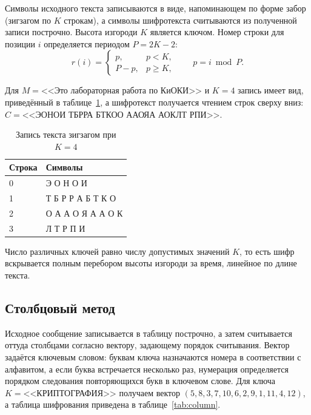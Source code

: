 \documentclass[14pt,a4paper]{extarticle}
\begin{document}
Символы исходного текста записываются в виде, напоминающем по форме забор
(зигзагом по $K$ строкам), а символы шифротекста считываются из полученной записи
построчно. Высота изгороди $K$ является ключом. Номер строки для позиции $i$
определяется периодом $P = 2K - 2$:
\begin{equation}
r(i) =
\begin{cases}
p, & p < K,\\
P - p, & p \geqslant K,
\end{cases}
\qquad p = i \bmod P.
\end{equation}

Для $M = \text{<<Это лабораторная работа по КиОКИ>>}$ и $K = 4$ запись имеет вид,
приведённый в таблице~\ref{tab:fence}, а шифротекст получается чтением строк сверху вниз:
$C = \text{<<ЭОНОИ ТБРРА БТКОО ААОЯА АОКЛТ РПИ>>}$.

\begin{table}[H]
\caption{Запись текста зигзагом при $K = 4$}
\label{tab:fence}
\centering
\begin{tabular}{ll}
\toprule
Строка & Символы \\
\midrule
0 & Э \quad О \quad Н \quad О \quad И \\
1 & Т \; Б \; Р \; Р \; А \; Б \; Т \; К \; О \\
2 & О \; А \; А \; О \; Я \; А \; А \; О \; К \\
3 & Л \quad Т \quad Р \quad П \quad И \\
\bottomrule
\end{tabular}
\end{table}

Число различных ключей равно числу допустимых значений $K$, то есть шифр вскрывается
полным перебором высоты изгороди за время, линейное по длине текста.

\subsection{Столбцовый метод}

Исходное сообщение записывается в таблицу построчно, а затем считывается оттуда
столбцами согласно вектору, задающему порядок считывания. Вектор задаётся ключевым
словом: буквам ключа назначаются номера в соответствии с алфавитом, а если буква
встречается несколько раз, нумерация определяется порядком следования повторяющихся
букв в ключевом слове. Для ключа $K = \text{<<КРИПТОГРАФИЯ>>}$ получаем вектор
$(5, 8, 3, 7, 10, 6, 2, 9, 1, 11, 4, 12)$, а таблица шифрования приведена в
таблице~\ref{tab:column}.
\end{document}
